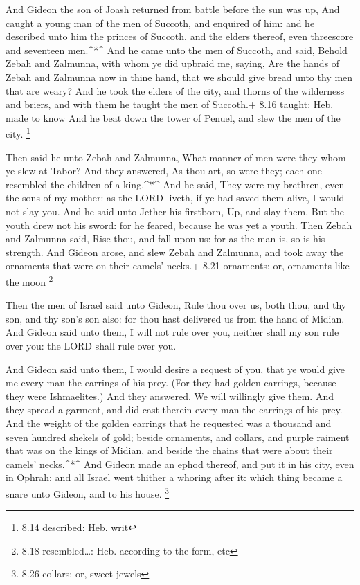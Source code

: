  And Gideon the son of Joash returned from battle before
the sun was up,  And caught a young man of the men of
Succoth, and enquired of him: and he described unto him the princes of
Succoth, and the elders thereof, even threescore and seventeen
men.\^{}*\^{}  And he came unto the men of Succoth, and
said, Behold Zebah and Zalmunna, with whom ye did upbraid me, saying,
Are the hands of Zebah and Zalmunna now in thine hand, that we should
give bread unto thy men that are weary?  And he took the
elders of the city, and thorns of the wilderness and briers, and with
them he taught the men of Succoth.+ 8.16 taught: Heb. made to know
 And he beat down the tower of Penuel, and slew the men of
the city. \footnote{8.14 described: Heb. writ}

 Then said he unto Zebah and Zalmunna, What manner of men
were they whom ye slew at Tabor? And they answered, As thou art, so were
they; each one resembled the children of a king.\^{}*\^{} 
And he said, They were my brethren, even the sons of my mother: as the
LORD liveth, if ye had saved them alive, I would not slay you.
 And he said unto Jether his firstborn, Up, and slay them.
But the youth drew not his sword: for he feared, because he was yet a
youth.  Then Zebah and Zalmunna said, Rise thou, and fall
upon us: for as the man is, so is his strength. And Gideon arose, and
slew Zebah and Zalmunna, and took away the ornaments that were on their
camels' necks.+ 8.21 ornaments: or, ornaments like the moon \footnote{8.18
  resembled\ldots: Heb. according to the form, etc}

 Then the men of Israel said unto Gideon, Rule thou over
us, both thou, and thy son, and thy son's son also: for thou hast
delivered us from the hand of Midian.  And Gideon said unto
them, I will not rule over you, neither shall my son rule over you: the
LORD shall rule over you.

 And Gideon said unto them, I would desire a request of
you, that ye would give me every man the earrings of his prey. (For they
had golden earrings, because they were Ishmaelites.)  And
they answered, We will willingly give them. And they spread a garment,
and did cast therein every man the earrings of his prey. 
And the weight of the golden earrings that he requested was a thousand
and seven hundred shekels of gold; beside ornaments, and collars, and
purple raiment that was on the kings of Midian, and beside the chains
that were about their camels' necks.\^{}*\^{}  And Gideon
made an ephod thereof, and put it in his city, even in Ophrah: and all
Israel went thither a whoring after it: which thing became a snare unto
Gideon, and to his house. \footnote{8.26 collars: or, sweet jewels}

